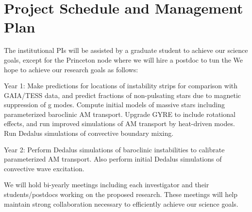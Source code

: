 \section{Project Schedule and Management Plan}

The institutional PIs will be assisted by a graduate student to achieve our science goals, except for the Princeton node where we will hire a postdoc to tun the We hope to achieve our research goals as follows:

Year 1: Make predictions for locations of instability strips for comparison with GAIA/TESS data, and predict fractions of non-pulsating stars due to magnetic suppression of g modes. Compute initial models of massive stars including parameterized baroclinic AM transport. Upgrade GYRE to include rotational effects, and run improved simulations of AM transport by heat-driven modes. Run Dedalus simulations of convective boundary mixing.

Year 2: Perform Dedalus simulations of baroclinic instabilities to calibrate parameterized AM transport. Also perform initial Dedalus simulations of convective wave excitation. 

We will  hold bi-yearly meetings including each investigator and their students/postdocs working on the proposed research. These meetings will help maintain strong collaboration necessary to efficiently achieve our science goals.
